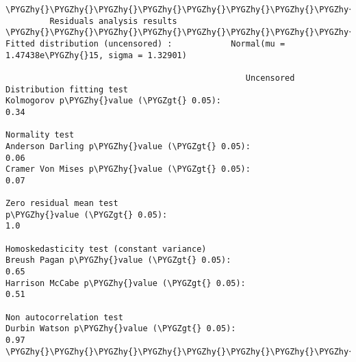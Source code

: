 \documentclass[letterpaper,10pt,english]{sphinxmanual}
\def\PYGZgt{\char`\>}
\def\PYGZhy{\char`\-}
\begin{document}
\begin{Verbatim}[commandchars=\\\{\}]
\PYGZhy{}\PYGZhy{}\PYGZhy{}\PYGZhy{}\PYGZhy{}\PYGZhy{}\PYGZhy{}\PYGZhy{}\PYGZhy{}\PYGZhy{}\PYGZhy{}\PYGZhy{}\PYGZhy{}\PYGZhy{}\PYGZhy{}\PYGZhy{}\PYGZhy{}\PYGZhy{}\PYGZhy{}\PYGZhy{}\PYGZhy{}\PYGZhy{}\PYGZhy{}\PYGZhy{}\PYGZhy{}\PYGZhy{}\PYGZhy{}\PYGZhy{}\PYGZhy{}\PYGZhy{}\PYGZhy{}\PYGZhy{}\PYGZhy{}\PYGZhy{}\PYGZhy{}\PYGZhy{}\PYGZhy{}\PYGZhy{}\PYGZhy{}\PYGZhy{}\PYGZhy{}\PYGZhy{}\PYGZhy{}\PYGZhy{}\PYGZhy{}\PYGZhy{}\PYGZhy{}\PYGZhy{}\PYGZhy{}\PYGZhy{}\PYGZhy{}\PYGZhy{}\PYGZhy{}\PYGZhy{}\PYGZhy{}\PYGZhy{}\PYGZhy{}\PYGZhy{}\PYGZhy{}\PYGZhy{}\PYGZhy{}\PYGZhy{}\PYGZhy{}\PYGZhy{}\PYGZhy{}\PYGZhy{}\PYGZhy{}\PYGZhy{}\PYGZhy{}\PYGZhy{}\PYGZhy{}\PYGZhy{}\PYGZhy{}\PYGZhy{}\PYGZhy{}\PYGZhy{}\PYGZhy{}\PYGZhy{}\PYGZhy{}\PYGZhy{}
         Residuals analysis results
\PYGZhy{}\PYGZhy{}\PYGZhy{}\PYGZhy{}\PYGZhy{}\PYGZhy{}\PYGZhy{}\PYGZhy{}\PYGZhy{}\PYGZhy{}\PYGZhy{}\PYGZhy{}\PYGZhy{}\PYGZhy{}\PYGZhy{}\PYGZhy{}\PYGZhy{}\PYGZhy{}\PYGZhy{}\PYGZhy{}\PYGZhy{}\PYGZhy{}\PYGZhy{}\PYGZhy{}\PYGZhy{}\PYGZhy{}\PYGZhy{}\PYGZhy{}\PYGZhy{}\PYGZhy{}\PYGZhy{}\PYGZhy{}\PYGZhy{}\PYGZhy{}\PYGZhy{}\PYGZhy{}\PYGZhy{}\PYGZhy{}\PYGZhy{}\PYGZhy{}\PYGZhy{}\PYGZhy{}\PYGZhy{}\PYGZhy{}\PYGZhy{}\PYGZhy{}\PYGZhy{}\PYGZhy{}\PYGZhy{}\PYGZhy{}\PYGZhy{}\PYGZhy{}\PYGZhy{}\PYGZhy{}\PYGZhy{}\PYGZhy{}\PYGZhy{}\PYGZhy{}\PYGZhy{}\PYGZhy{}\PYGZhy{}\PYGZhy{}\PYGZhy{}\PYGZhy{}\PYGZhy{}\PYGZhy{}\PYGZhy{}\PYGZhy{}\PYGZhy{}\PYGZhy{}\PYGZhy{}\PYGZhy{}\PYGZhy{}\PYGZhy{}\PYGZhy{}\PYGZhy{}\PYGZhy{}\PYGZhy{}\PYGZhy{}\PYGZhy{}
Fitted distribution (uncensored) :            Normal(mu = 1.47438e\PYGZhy{}15, sigma = 1.32901)

                                                 Uncensored
Distribution fitting test
Kolmogorov p\PYGZhy{}value (\PYGZgt{} 0.05):                           0.34

Normality test
Anderson Darling p\PYGZhy{}value (\PYGZgt{} 0.05):                     0.06
Cramer Von Mises p\PYGZhy{}value (\PYGZgt{} 0.05):                     0.07

Zero residual mean test
p\PYGZhy{}value (\PYGZgt{} 0.05):                                       1.0

Homoskedasticity test (constant variance)
Breush Pagan p\PYGZhy{}value (\PYGZgt{} 0.05):                         0.65
Harrison McCabe p\PYGZhy{}value (\PYGZgt{} 0.05):                      0.51

Non autocorrelation test
Durbin Watson p\PYGZhy{}value (\PYGZgt{} 0.05):                        0.97
\PYGZhy{}\PYGZhy{}\PYGZhy{}\PYGZhy{}\PYGZhy{}\PYGZhy{}\PYGZhy{}\PYGZhy{}\PYGZhy{}\PYGZhy{}\PYGZhy{}\PYGZhy{}\PYGZhy{}\PYGZhy{}\PYGZhy{}\PYGZhy{}\PYGZhy{}\PYGZhy{}\PYGZhy{}\PYGZhy{}\PYGZhy{}\PYGZhy{}\PYGZhy{}\PYGZhy{}\PYGZhy{}\PYGZhy{}\PYGZhy{}\PYGZhy{}\PYGZhy{}\PYGZhy{}\PYGZhy{}\PYGZhy{}\PYGZhy{}\PYGZhy{}\PYGZhy{}\PYGZhy{}\PYGZhy{}\PYGZhy{}\PYGZhy{}\PYGZhy{}\PYGZhy{}\PYGZhy{}\PYGZhy{}\PYGZhy{}\PYGZhy{}\PYGZhy{}\PYGZhy{}\PYGZhy{}\PYGZhy{}\PYGZhy{}\PYGZhy{}\PYGZhy{}\PYGZhy{}\PYGZhy{}\PYGZhy{}\PYGZhy{}\PYGZhy{}\PYGZhy{}\PYGZhy{}\PYGZhy{}\PYGZhy{}\PYGZhy{}\PYGZhy{}\PYGZhy{}\PYGZhy{}\PYGZhy{}\PYGZhy{}\PYGZhy{}\PYGZhy{}\PYGZhy{}\PYGZhy{}\PYGZhy{}\PYGZhy{}\PYGZhy{}\PYGZhy{}\PYGZhy{}\PYGZhy{}\PYGZhy{}\PYGZhy{}\PYGZhy{}
\end{Verbatim}
\end{document}
